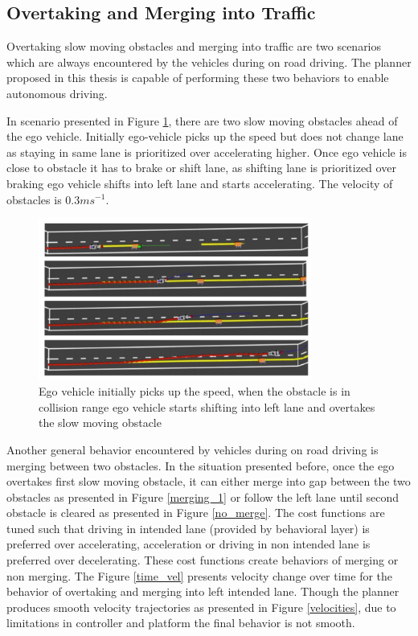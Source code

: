 \subsection{Overtaking and Merging into Traffic}

Overtaking slow moving obstacles and merging into traffic are two scenarios which are always encountered by the vehicles during on road driving. The planner proposed in this thesis is capable of performing these two behaviors to enable autonomous driving. 

In scenario presented in Figure \ref{slow_moving_1}, there are two slow moving obstacles ahead of the ego vehicle. Initially ego-vehicle picks up the speed but does not change lane as staying in same lane is prioritized over accelerating higher. Once ego vehicle is close to obstacle it has to brake or shift lane, as shifting lane is prioritized over braking ego vehicle shifts into left lane and starts accelerating. The velocity of obstacles is $0.3ms^{-1}$. 

\begin{figure}
	\centering
	\includegraphics[width=0.8\textwidth]{Images/evaluation/overtake_1.jpg}
	\caption{Ego vehicle initially picks up the speed, when the obstacle is in collision range ego vehicle starts shifting into left lane and overtakes the slow moving obstacle}
	\label{slow_moving_1}
\end{figure}


Another general behavior encountered by vehicles during on road driving is merging between two obstacles. In the situation presented before, once the ego overtakes first slow moving obstacle, it can either merge into gap between the two obstacles as presented in Figure \ref{merging_1} or follow the left lane until second obstacle is cleared as presented in Figure \ref{no_merge}. The cost functions are tuned such that driving in intended lane (provided by behavioral layer) is preferred over accelerating, acceleration or driving in non intended lane is preferred over decelerating. These cost functions create behaviors of merging or non merging. The Figure \ref{time_vel} presents velocity change over time for the behavior of overtaking and merging into left intended lane. Though the planner produces smooth velocity trajectories as presented in Figure \ref{velocities}, due to limitations in controller and platform the final behavior is not smooth.

